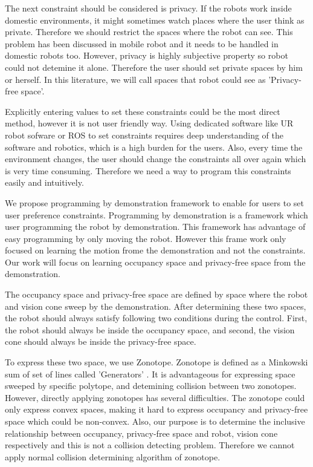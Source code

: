 \documentclass[lettersize,journal]{IEEEtran}
\begin{document}
The next constraint should be considered is privacy. If the robots work inside domestic environments, it might sometimes watch places where the user think as private.
Therefore we should restrict the spaces where the robot can see.
This problem has been discussed in mobile robot \cite{Face_privacy} \cite{User_preference_aware_navigation} and it needs to be handled in domestic robots too.
However, privacy is highly subjective property so robot could not detemine it alone.
Therefore the user should set private spaces by him or herself.
In this literature, we will call spaces that robot could see as 'Privacy-free space'.

Explicitly entering values to set these constraints could be the most direct method, however it is not user friendly way.
Using dedicated software like UR robot sofware or ROS to set constraints requires deep understanding of the software and robotics, which is a high burden for the users.
Also, every time the environment changes, the user should change the constraints all over again which is very time consuming.
Therefore we need a way to program this constraints easily and intuitively.

We propose programming by demonstration framework to enable for users to set user preference constraints.
Programming by demonstration\cite{Programming_by_demonstration} is a framework which user programming the robot by demonstration.
This framework has advantage of easy programming by only moving the robot. 
However this frame work only focused on learning the motion frome the demonstration and not the constraints.
Our work will focus on learning occupancy space and privacy-free space from the demonstration.

The occupancy space and privacy-free space are defined by space where the robot and vision cone sweep by the demonstration. 
After determining these two spaces, the robot should always satisfy following two conditions during the control.
First, the robot should always be inside the occupancy space, and second, the vision cone should always be inside the privacy-free space.

To express these two space, we use Zonotope.
Zonotope is defined as a Minkowski sum of set of lines called 'Generators' \cite{Zonotopes}.
It is advantageous for expressing space sweeped by specific polytope, and detemining collision between two zonotopes.
However, directly applying zonotopes has several difficulties.
The zonotope could only express convex spaces, making it hard to express occupancy and privacy-free space which could be non-convex.
Also, our purpose is to determine the inclusive relationship between occupancy, privacy-free space and robot, vision cone respectively and this is not a collision detecting problem.
Therefore we cannot apply normal collision determining algorithm of zonotope.
\end{document}
